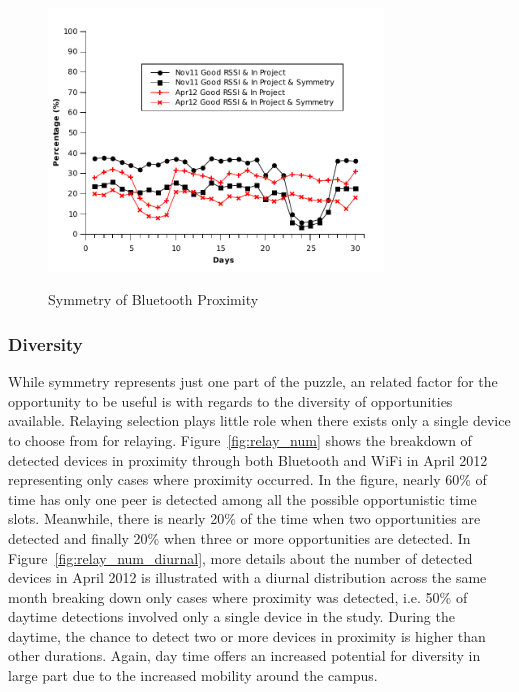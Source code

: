 \begin{figure}[tbp]
\centering 
{\includegraphics[width=3.5in]{graphs/daily_symmetric.pdf}}
\caption{Symmetry of Bluetooth Proximity} 
\label{fig:daily_symmetric}
\end{figure} 


\subsubsection{Diversity}
While symmetry represents just one part of the puzzle, an related factor for the opportunity to be useful is with regards to the diversity of opportunities available.  Relaying selection plays little role when there exists only a single device to choose from for relaying.   Figure~\ref{fig:relay_num} shows the breakdown of detected devices in proximity through both Bluetooth and WiFi in April 2012 representing only cases where proximity occurred. In the figure, nearly 60\% of time has only one peer is detected among all the possible opportunistic time slots. Meanwhile, there is nearly 20\% of the time when two opportunities are detected and finally 20\% when three or more opportunities are detected. In Figure~\ref{fig:relay_num_diurnal}, more details about the number of detected devices in April 2012 is illustrated with a diurnal distribution across the same month breaking down only cases where proximity was detected, i.e. 50\% of daytime detections involved only a single device in the study. During the daytime, the chance to detect two or more devices in proximity is higher than other durations. Again, day time offers an increased potential for diversity in large part due to the increased mobility around the campus.  

